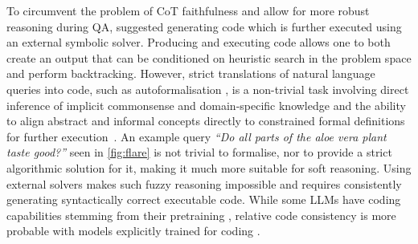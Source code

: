 \documentclass{article} %
\newcommand{\ours}{\texorpdfstring{FLARE}\xspace}
\begin{document}
%
%
%
To circumvent the problem of CoT faithfulness and allow for more robust reasoning during QA, \citet[Faithful CoT]{DBLP:conf/acl/Xu0P0LH24} suggested generating code which is further executed using an external symbolic solver.
%
Producing and executing code allows one to both create an output that can be conditioned on heuristic search in the problem space and perform backtracking.
%
However, strict translations of natural language queries into code, such as autoformalisation \citep{DBLP:conf/mkm/Szegedy20,DBLP:conf/mkm/WangKU18}, is a non-trivial task involving direct inference of implicit commonsense and domain-specific knowledge and the ability to align abstract and informal concepts directly to constrained formal definitions for further execution~\citep{DBLP:conf/nips/WuJLRSJS22}.
%
An example query \emph{``Do all parts of the aloe vera plant taste good?''} seen in \cref{fig:flare} is not trivial to formalise, nor to provide a strict algorithmic solution for it, making it much more suitable for soft reasoning.
%
Using external solvers makes such fuzzy reasoning impossible and requires consistently generating syntactically correct executable code.
%
While some LLMs have coding capabilities stemming from their pretraining \citep{DBLP:journals/corr/abs-2406-00515,DBLP:journals/corr/abs-2408-10914}, relative code consistency is more probable with models explicitly trained for coding \citep{DBLP:journals/corr/abs-2107-03374}.
%
\end{document}

